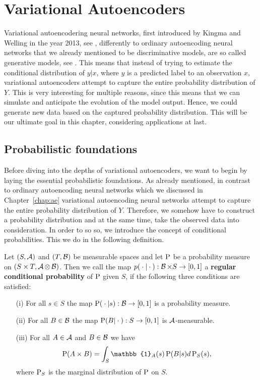 \chapter{Variational Autoencoders}\label{chap:vae}

Variational autoencodering neural networks, first introduced by Kingma and Welling in the year 2013, see \cite{kingma2013auto}, differently to ordinary autoencoding neural networks that we already mentioned to be discriminative models, are so called generative models, see \cite[Chapter~5]{cinelli2021variational}. This means that instead of trying to estimate the conditional distribution of $y|x$, where $y$ is a predicted label to an observation $x$, variational autoencoders attempt to capture the entire probability distribution of $Y$. This is very interesting for multiple reasons, since this means that we can simulate and anticipate the evolution of the model output. Hence, we could generate new data based on the captured probability distribution. This will be our ultimate goal in this chapter, considering applications at last.

\section{Probabilistic foundations}\label{sec:prob_foundations}

Before diving into the depths of variational autoencoders, we want to begin by laying the essential probabilistic foundations. As already mentioned, in contrast to ordinary autoencoding neural networks which we discussed in Chapter~\ref{chap:ae} variational autoencoding neural networks attempt to capture the entire probability distribution of $Y$. Therefore, we somehow have to construct a probability distribution and at the same time, take the observed data into consideration. In order to so so, we introduce the concept of conditional probabilities. This we do in the following definition.

\begin{definition}\label{def:cond_prob}
Let $(S,\operatorname{\mathcal{A}})$ and $(T,\operatorname{\mathcal{B}})$ be measurable spaces and let $\operatorname{\text{P}}$ be a probability measure on $(S\times T, \operatorname{\mathcal{A}}\otimes \operatorname{\mathcal{B}})$. Then we call the map $p({}\cdot{}|{}\cdot{}):\operatorname{\mathcal{B}}\times S \to [0, 1]$ a \textbf{regular conditional probability} of $\operatorname{\text{P}}$ given $S$, if the following three conditions are satisfied:
\begin{itemize}
\item[(i)]   For all $s\in S$ the map $\operatorname{\text{P}}({}\cdot{}|s): \operatorname{\mathcal{B}} \to [0,1]$ is a probability measure.
\item[(ii)]  For all $B\in\operatorname{\mathcal{B}}$ the map $\operatorname{\text{P}}(B|{}\cdot{}): S \to [0,1]$ is $\operatorname{\mathcal{A}}$-measurable.
\item[(iii)] For all $A\in\operatorname{\mathcal{A}}$ and $B\in\operatorname{\mathcal{B}}$ we have \begin{align*}
\prob(A\times B) = \int_{S} \mathbb{1}_{A}(s) \prob(B|s)d\prob_S(s),
\end{align*}
where $\operatorname{\text{P}}_S$ is the marginal distribution of $\operatorname{\text{P}}$ on $S$.
\end{itemize}
\end{definition}

